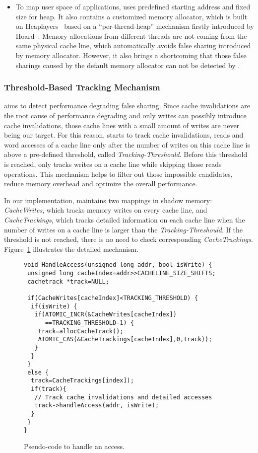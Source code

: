 \begin{itemize}
\item
To map user space of applications,  uses predefined starting address and fixed size for 
heap. It also contains a customized memory allocator, which is built on 
Heaplayers~\cite{heaplayers} based on a ``per-thread-heap'' mechanism firstly introduced 
by Hoard~\cite{Hoard}. Memory allocations from different threads 
are not coming from the same physical cache line, which automatically avoids false sharing 
introduced by memory allocator.
However, it also brings a shortcoming that those false sharings caused by the default memory 
allocator can not be detected by . 

\end{itemize} 
 
\subsubsection{Threshold-Based Tracking Mechanism}
\Defaults{} aims to detect performance degrading false sharing.
Since cache invalidations are the root cause of performance degrading and only writes 
can possibly introduce cache invalidations, 
those cache lines with a small amount of writes are never being our target.
For this reason,  starts to track cache invalidations, reads and word accesses 
of a cache line only after the number of writes on this cache line is above a
pre-defined threshold, called {\it Tracking-Threshould}. 
Before this threshold is reached,  only tracks writes on a cache line while skipping those 
reads operations. 
This mechanism helps to filter out
those impossible candidates, reduce memory overhead and optimize the overall performance. 

In our implementation,  maintains two mappings in shadow memory: 
{\it CacheWrites}, which tracks memory writes on every cache line, 
and {\it CacheTrackings}, which tracks detailed information 
on each cache line when the number of writes on a cache line is larger than
the {\it Tracking-Threshould}. 
If the threshold is not reached, there is no need to check corresponding {\it CacheTrackings}. 
Figure~\ref{fig:algorithm} illustrates the detailed mechanism.

\begin{figure}[!t]
\begin{lstlisting}
void HandleAccess(unsigned long addr, bool isWrite) {
 unsigned long cacheIndex=addr>>CACHELINE_SIZE_SHIFTS;
 cachetrack *track=NULL;

 if(CacheWrites[cacheIndex]<TRACKING_THRESHOLD) {
  if(isWrite) {
   if(ATOMIC_INCR(&CacheWrites[cacheIndex]) 
      ==TRACKING_THRESHOLD-1) {
    track=allocCacheTrack();
    ATOMIC_CAS(&CacheTrackings[cacheIndex],0,track));
   }
  } 
 }
 else {
  track=CacheTrackings[index]);
  if(track){
   // Track cache invalidations and detailed accesses
   track->handleAccess(addr, isWrite);
  }
 }
}
\end{lstlisting}
\caption{Pseudo-code to handle an access.\label{fig:algorithm}}
\end{figure}

